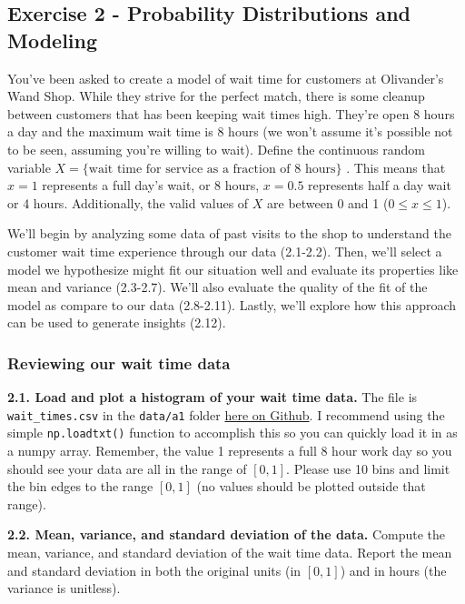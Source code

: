 \documentclass[
  letterpaper,
  DIV=11,
  numbers=noendperiod]{scrartcl}
\begin{document}
\newpage{}

\subsection{Exercise 2 - Probability Distributions and
Modeling}\label{exercise-2---probability-distributions-and-modeling}

You've been asked to create a model of wait time for customers at
Olivander's Wand Shop. While they strive for the perfect match, there is
some cleanup between customers that has been keeping wait times high.
They're open 8 hours a day and the maximum wait time is 8 hours (we
won't assume it's possible not to be seen, assuming you're willing to
wait). Define the continuous random variable
\(X = \{\text{wait time for service as a fraction of 8 hours}\}\) . This
means that \(x=1\) represents a full day's wait, or 8 hours, \(x=0.5\)
represents half a day wait or 4 hours. Additionally, the valid values of
\(X\) are between 0 and 1 (\(0\leq x \leq 1\)).

We'll begin by analyzing some data of past visits to the shop to
understand the customer wait time experience through our data (2.1-2.2).
Then, we'll select a model we hypothesize might fit our situation well
and evaluate its properties like mean and variance (2.3-2.7). We'll also
evaluate the quality of the fit of the model as compare to our data
(2.8-2.11). Lastly, we'll explore how this approach can be used to
generate insights (2.12).

\subsubsection{Reviewing our wait time
data}\label{reviewing-our-wait-time-data}

\textbf{2.1. Load and plot a histogram of your wait time data.} The file
is \texttt{wait\_times.csv} in the \texttt{data/a1} folder
\href{https://github.com/kylebradbury/ids705/tree/main/notebooks/data/a1}{here
on Github}. I recommend using the simple \texttt{np.loadtxt()} function
to accomplish this so you can quickly load it in as a numpy array.
Remember, the value 1 represents a full 8 hour work day so you should
see your data are all in the range of \([0,1]\). Please use 10 bins and
limit the bin edges to the range \([0,1]\) (no values should be plotted
outside that range).

\textbf{2.2. Mean, variance, and standard deviation of the data.}
Compute the mean, variance, and standard deviation of the wait time
data. Report the mean and standard deviation in both the original units
(in \([0,1]\)) and in hours (the variance is unitless).
\end{document}
